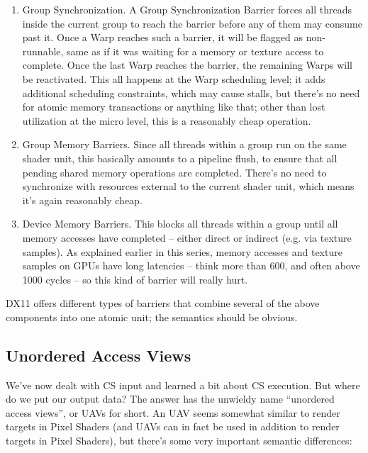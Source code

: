 \documentclass[12pt]{article}
\begin{document}
\begin{enumerate}
\item Group Synchronization. A Group Synchronization Barrier forces all threads inside the current group to reach the barrier before any of them may consume past it. Once a Warp reaches such a barrier, it will be flagged as non-runnable, same as if it was waiting for a memory or texture access to complete. Once the last Warp reaches the barrier, the remaining Warps will be reactivated. This all happens at the Warp scheduling level; it adds additional scheduling constraints, which may cause stalls, but there’s no need for atomic memory transactions or anything like that; other than lost utilization at the micro level, this is a reasonably cheap operation.
\item Group Memory Barriers. Since all threads within a group run on the same shader unit, this basically amounts to a pipeline flush, to ensure that all pending shared memory operations are completed. There’s no need to synchronize with resources external to the current shader unit, which means it’s again reasonably cheap.
\item Device Memory Barriers. This blocks all threads within a group until all memory accesses have completed – either direct or indirect (e.g. via texture samples). As explained earlier in this series, memory accesses and texture samples on GPUs have long latencies – think more than 600, and often above 1000 cycles – so this kind of barrier will really hurt.
\end{enumerate}

DX11 offers different types of barriers that combine several of the above components into one atomic unit; the semantics should be obvious.

\subsection{Unordered Access Views}
\label{sec:orga0d9b3c}

We’ve now dealt with CS input and learned a bit about CS execution. But where do we put our output data? The answer has the unwieldy name “unordered access views”, or UAVs for short. An UAV seems somewhat similar to render targets in Pixel Shaders (and UAVs can in fact be used in addition to render targets in Pixel Shaders), but there’s some very important semantic differences:
\end{document}
